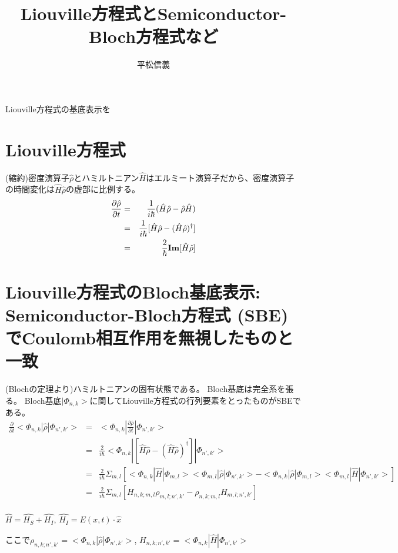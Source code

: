 \documentclass[11pt]{jarticle}
\begin{document}
\title{Liouville方程式とSemiconductor-Bloch方程式など}
\author{平松信義}
\maketitle

Liouville方程式の基底表示を

\section{Liouville方程式}
(縮約)密度演算子$\hat{\rho}$とハミルトニアン$\hat{H}$はエルミート演算子だから、密度演算子の時間変化は$\hat{H}\hat{\rho}$の虚部に比例する。
\begin{eqnarray*}
\frac{\partial \hat{\rho} }{\partial t } &=& \frac{1}{i \hbar} ( \hat{H} \hat{\rho} - \hat{\rho} \hat{H} )\\
&=& \frac{1}{i \hbar} [ \hat{H} \hat{\rho} - ( \hat{H} \hat{\rho} )^{\dag}  ]\\
&=& \frac{2}{\hbar} {\bf Im}[ \hat{H} \hat{\rho} ]
\end{eqnarray*}

\section{Liouville方程式のBloch基底表示: Semiconductor-Bloch方程式 (SBE)でCoulomb相互作用を無視したものと一致}
(Blochの定理より)ハミルトニアンの固有状態である。
Bloch基底は完全系を張る。
Bloch基底$|\Phi_{n,k}>$に関してLiouville方程式の行列要素をとったものがSBEである。
\begin{eqnarray*}
\frac{ \partial }{\partial t } <\Phi_{n,k}| \hat{\rho} |\Phi_{n',k'}> &=& <\Phi_{n,k}| \frac{\partial \hat{\rho}}{\partial t } |\Phi_{n',k'}>\\
&=& \frac{2}{i \hbar}  <\Phi_{n,k}| [ \hat{H} \hat{\rho} - ( \hat{H} \hat{\rho} )^{\dag} ] |\Phi_{n',k'}>\\
&=& \frac{2}{i \hbar}  \Sigma_{m,l} [ <\Phi_{n,k}| \hat{H} |\Phi_{m,l}><\Phi_{m,l}| \hat{\rho} |\Phi_{n',k'}> - <\Phi_{n,k}| \hat{\rho} |\Phi_{m,l}><\Phi_{m,l}| \hat{H} |\Phi_{n',k'}>]\\
&=& \frac{2}{i \hbar}  \Sigma_{m,l} [ H_{n,k; m,l}\rho_{m,l; n',k'} - \rho_{n,k; m,l}H_{m,l; n',k'} ]\\
\end{eqnarray*}

$\hat{H}=\hat{H_S}+\hat{H_I}$, $\hat{H_I}= E(x,t) \cdot \hat{x}$

ここで$\rho_{n,k; n',k'} = <\Phi_{n,k}| \hat{\rho} |\Phi_{n',k'}>$, $H_{n,k; n',k'} = <\Phi_{n,k}| \hat{H} |\Phi_{n',k'}>$
\end{document}
